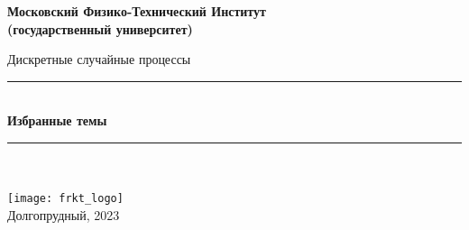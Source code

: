 \newcommand{\HRule}{\rule{\linewidth}{0.7mm}} %
	
	\begin{center}
		\large\textbf{Московский Физико-Технический Институт}\\
		\large\textbf{(государственный университет)}
	
		\vfill
		
		\Large Дискретные случайные процессы\\[0.5cm] %
		
		
		\HRule
		\\[0.4cm]
		{ \huge \bfseries Избранные темы}
		\\[0.4cm] %
		\HRule
		\\[0.5cm]
		
		\ \\

		\vfill
		\hspace*{-0.8 cm}\texttt{[image: frkt\_logo]}\\
		\large Долгопрудный, 2023
	\end{center}

\newpage
\setcounter{page}{2}
\fancyfoot[c]{\thepage}
\fancyhead[R]{}